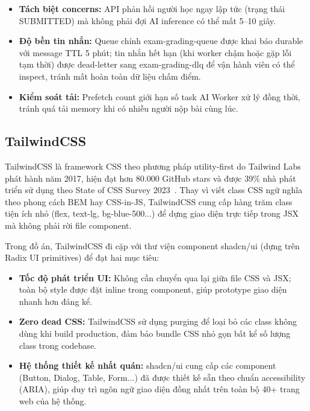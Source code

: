 \begin{itemize}
    \item \textbf{Tách biệt concerns:} API phản hồi người học ngay lập tức (trạng thái SUBMITTED) mà không phải đợi AI inference có thể mất 5--10 giây.
    \item \textbf{Độ bền tin nhắn:} Queue chính exam-grading-queue được khai báo durable với message TTL 5 phút; tin nhắn hết hạn (khi worker chậm hoặc gặp lỗi tạm thời) được dead-letter sang exam-grading-dlq để vận hành viên có thể inspect, tránh mất hoàn toàn dữ liệu chấm điểm.
    \item \textbf{Kiểm soát tải:} Prefetch count giới hạn số task AI Worker xử lý đồng thời, tránh quá tải memory khi có nhiều người nộp bài cùng lúc.
\end{itemize}

\subsection{TailwindCSS}

TailwindCSS là framework CSS theo phương pháp utility-first do Tailwind Labs phát hành năm 2017, hiện đạt hơn 80.000 GitHub stars và được 39\% nhà phát triển sử dụng theo State of CSS Survey 2023~\cite{tailwindcss-docs}. Thay vì viết class CSS ngữ nghĩa theo phong cách BEM hay CSS-in-JS, TailwindCSS cung cấp hàng trăm class tiện ích nhỏ (flex, text-lg, bg-blue-500...) để dựng giao diện trực tiếp trong JSX mà không phải rời file component.

Trong đồ án, TailwindCSS đi cặp với thư viện component shadcn/ui (dựng trên Radix UI primitives) để đạt hai mục tiêu:

\begin{itemize}
    \item \textbf{Tốc độ phát triển UI:} Không cần chuyển qua lại giữa file CSS và JSX; toàn bộ style được đặt inline trong component, giúp prototype giao diện nhanh hơn đáng kể.
    \item \textbf{Zero dead CSS:} TailwindCSS sử dụng purging để loại bỏ các class không dùng khi build production, đảm bảo bundle CSS nhỏ gọn bất kể số lượng class trong codebase.
    \item \textbf{Hệ thống thiết kế nhất quán:} shadcn/ui cung cấp các component (Button, Dialog, Table, Form...) đã được thiết kế sẵn theo chuẩn accessibility (ARIA), giúp duy trì ngôn ngữ giao diện đồng nhất trên toàn bộ 40+ trang web của hệ thống.
\end{itemize}

